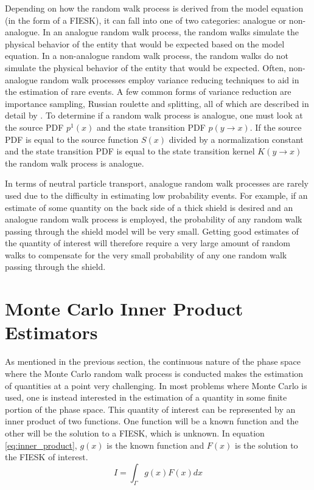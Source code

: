 Depending on how the random walk process is derived from the model equation (in
the form of a FIESK), it can fall into one of two categories: analogue or 
non-analogue. In an analogue random walk process, the random walks simulate 
the physical behavior of the entity that would be expected based on the model 
equation. In a non-analogue random walk process, the random walks do not 
simulate the physical behavior of the entity that would be expected. Often, 
non-analogue random walk processes employ variance reducing techniques to aid 
in the estimation of rare events. A few common forms of variance reduction are
importance sampling, Russian roulette and splitting, all of which are described
in detail by \citet{spanier_monte_1969}. To determine if a random walk
process is analogue, one must look at the source PDF $p^1(x)$ and the state 
transition PDF $p(y \to x)$. If the source PDF is equal to the source function
$S(x)$ divided by a normalization constant and the state transition PDF is 
equal to the state transition kernel $K(y \to x)$ the random walk process is 
analogue. 

In terms of neutral particle transport, analogue random walk processes are 
rarely used due to the difficulty in estimating low probability events. For
example, if an estimate of some quantity on the back side of a thick shield is 
desired and an analogue random walk process is employed, the probability of any 
random walk passing through the shield model will be very small. Getting good
estimates of the quantity of interest will therefore require a very large
amount of random walks to compensate for the very small probability of any one
random walk passing through the shield. 

\section{Monte Carlo Inner Product Estimators}
\label{sec:mc_int_eqn_estimators}
As mentioned in the previous section, the continuous nature of the phase space
where the Monte Carlo random walk process is conducted makes the estimation of
quantities at a point very challenging. In most problems where Monte Carlo is 
used, one is instead interested in the estimation of a quantity in some finite 
portion of the phase space. This quantity of interest can be represented by
an inner product of two functions. One function will be a known function and
the other will be the solution to a FIESK, which is unknown. In equation 
\ref{eq:inner_product}, $g(x)$ is the known function and $F(x)$ is the solution 
to the FIESK of interest.
\begin{equation}
  I = \int_{\Gamma} g(x)F(x)dx
  \label{eq:inner_product}
\end{equation}

